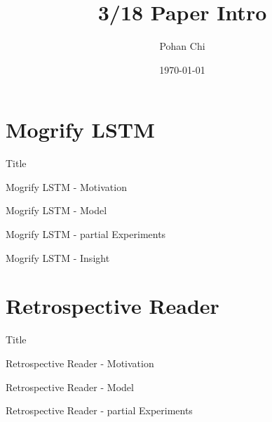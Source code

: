 \documentclass[10pt]{beamer}
\title{3/18 Paper Intro}
\subtitle{}
\author{Pohan Chi}
\date{\today}
\begin{document}
\maketitle

\maketoc

\section{Mogrify LSTM}

\begin{frame}{Title}
    
\end{frame}

\begin{frame}{Mogrify LSTM - Motivation}

\end{frame}

\begin{frame}{Mogrify LSTM - Model}

\end{frame}

\begin{frame}{Mogrify LSTM - partial Experiments}

\end{frame}

\begin{frame}{Mogrify LSTM - Insight}

\end{frame}

\section{Retrospective Reader}

\begin{frame}{Title}
    
\end{frame}

\begin{frame}{Retrospective Reader - Motivation}

\end{frame}

\begin{frame}{Retrospective Reader - Model}

\end{frame}

\begin{frame}{Retrospective Reader - partial Experiments}

\end{frame}
\end{document}
